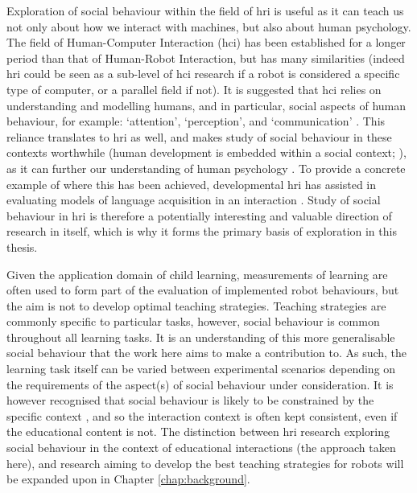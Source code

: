 Exploration of social behaviour within the field of \acrshort{hri} is useful as it can teach us not only about how we interact with machines, but also about human psychology. The field of Human-Computer Interaction (\acrshort{hci}) has been established for a longer period than that of Human-Robot Interaction, but has many similarities (indeed \acrshort{hri} could be seen as a sub-level of \acrshort{hci} research if a robot is considered a specific type of computer, or a parallel field if not). It is suggested that \acrshort{hci} relies on understanding and modelling humans, and in particular, social aspects of human behaviour, for example: `attention', `perception', and `communication' \citep{hewett1992acm}. This reliance translates to \acrshort{hri} as well, and makes study of social behaviour in these contexts worthwhile (human development is embedded within a social context; \citealp{rogoff1990apprenticeship}), as it can further our understanding of human psychology \citep{morse2011role}. To provide a concrete example of where this has been achieved, developmental \acrshort{hri} has assisted in evaluating models of language acquisition in an interaction \citep{morse2015posture}. Study of social behaviour in \acrshort{hri} is therefore a potentially interesting and valuable direction of research in itself, which is why it forms the primary basis of exploration in this thesis.

Given the application domain of child \gls{learning}, measurements of \gls{learning} are often used to form part of the evaluation of implemented robot behaviours, but the aim is not to develop optimal teaching strategies. Teaching strategies are commonly specific to particular tasks, however, social behaviour is common throughout all \gls{learning} tasks. It is an understanding of this more generalisable social behaviour that the work here aims to make a contribution to. As such, the \gls{learning} task itself can be varied between experimental scenarios depending on the requirements of the aspect(s) of social behaviour under consideration. It is however recognised that social behaviour is likely to be constrained by the specific context \citep{kennedy2013constraining}, and so the interaction context is often kept consistent, even if the educational content is not. The distinction between \acrshort{hri} research exploring social behaviour in the context of educational interactions (the approach taken here), and research aiming to develop the best teaching strategies for robots will be expanded upon in Chapter \ref{chap:background}.

